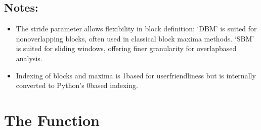 \documentclass[a4paper,11pt,openany,english]{sphinxmanual}
\begin{document}
\begin{fulllineitems}
\subsection{Notes:}
\label{\detokenize{api_biascorrection:id7}}\begin{itemize}
\item {} 
\sphinxAtStartPar
The stride parameter allows flexibility in block definition:
\sphinxhyphen{} ‘DBM’ is suited for non\sphinxhyphen{}overlapping blocks, often used in classical block maxima methods.
\sphinxhyphen{} ‘SBM’ is suited for sliding windows, offering finer granularity for overlap\sphinxhyphen{}based analysis.

\item {} 
\sphinxAtStartPar
Indexing of blocks and maxima is 1\sphinxhyphen{}based for user\sphinxhyphen{}friendliness but is internally converted 
to Python’s 0\sphinxhyphen{}based indexing.

\end{itemize}

\end{fulllineitems}



\section{The  Function}
\label{\detokenize{api_biascorrection:the-hat-pi0-function}}
\end{document}
